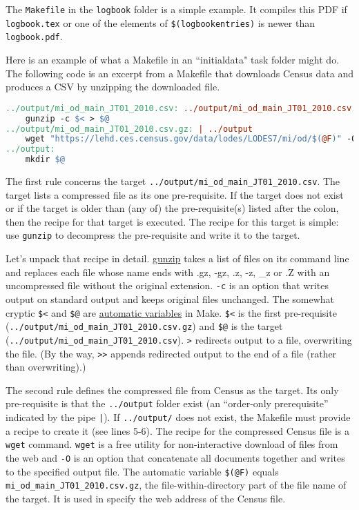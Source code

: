 The \texttt{Makefile} in the \texttt{logbook} folder is a simple example.
It compiles this PDF if \texttt{logbook.tex} or one of the elements of \texttt{\$(logbookentries)} is newer than \texttt{logbook.pdf}.

Here is an example of what a Makefile in an ``initialdata" task folder might do.
The following code is an excerpt from a Makefile that downloads Census data and produces a CSV by unzipping the downloaded file.
\begin{lstlisting}[language=make]
../output/mi_od_main_JT01_2010.csv: ../output/mi_od_main_JT01_2010.csv.gz
	gunzip -c $< > $@
../output/mi_od_main_JT01_2010.csv.gz: | ../output
	wget "https://lehd.ces.census.gov/data/lodes/LODES7/mi/od/$(@F)" -O ../output/$(@F)
../output:
	mkdir $@
\end{lstlisting}
The first rule concerns the target \texttt{../output/mi\_od\_main\_JT01\_2010.csv}.
The target lists a compressed file as its one pre-requisite.
If the target does not exist or if the target is older than (any of) the pre-requisite(s) listed after the colon,
then the recipe for that target is executed.
The recipe for this target is simple: use \texttt{gunzip} to decompress the pre-requisite and write it to the target.

Let's unpack that recipe in detail.
\href{https://linux.die.net/man/1/gunzip}{gunzip} takes a list of files on its command line and replaces each file whose name ends with .gz, -gz, .z, -z, \_z or .Z with an uncompressed file without the original extension.
\texttt{-c} is an option that writes output on standard output and keeps original files unchanged.
The somewhat cryptic \texttt{\$<} and \texttt{\$@} are \href{https://www.gnu.org/software/make/manual/html_node/Automatic-Variables.html}{automatic variables} in Make.
\texttt{\$<} is the first pre-requisite (\texttt{../output/mi\_od\_main\_JT01\_2010.csv.gz})
and
\texttt{\$@} is the target (\texttt{../output/mi\_od\_main\_JT01\_2010.csv}).
\texttt{>} redirects output to a file, overwriting the file.
(By the way, \texttt{>>} appends redirected output to the end of a file (rather than overwriting).)

The second rule defines the compressed file from Census as the target.
Its only pre-requisite is that the \texttt{../output} folder exist
(an ``order-only prerequisite'' indicated by the pipe \texttt{|}).
If \texttt{../output/} does not exist, the Makefile must provide a recipe to create it
(see lines 5-6).
The recipe for the compressed Census file is a \texttt{wget} command.
\texttt{wget} is a free utility for non-interactive download of files from the web
and \texttt{-O} is an option that concatenate all documents together and writes to the specified output file.
The automatic variable \texttt{\$(@F)} equals \texttt{mi\_od\_main\_JT01\_2010.csv.gz},
the file-within-directory part of the file name of the target.
It is used in specify the web address of the Census file.

